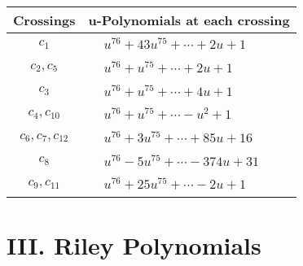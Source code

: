 \documentclass[1p]{elsarticle_modified}
\theoremstyle{definition}
\begin{document}
\begin{tabular}{m{50pt}|m{274pt}}
Crossings & \hspace{64pt}u-Polynomials at each crossing \\
\hline $$\begin{aligned}c_{1}\end{aligned}$$&$\begin{aligned}
&u^{76}+43 u^{75}+\cdots+2 u+1
\end{aligned}$\\
\hline $$\begin{aligned}c_{2},c_{5}\end{aligned}$$&$\begin{aligned}
&u^{76}+u^{75}+\cdots+2 u+1
\end{aligned}$\\
\hline $$\begin{aligned}c_{3}\end{aligned}$$&$\begin{aligned}
&u^{76}+u^{75}+\cdots+4 u+1
\end{aligned}$\\
\hline $$\begin{aligned}c_{4},c_{10}\end{aligned}$$&$\begin{aligned}
&u^{76}+u^{75}+\cdots- u^2+1
\end{aligned}$\\
\hline $$\begin{aligned}c_{6},c_{7},c_{12}\end{aligned}$$&$\begin{aligned}
&u^{76}+3 u^{75}+\cdots+85 u+16
\end{aligned}$\\
\hline $$\begin{aligned}c_{8}\end{aligned}$$&$\begin{aligned}
&u^{76}-5 u^{75}+\cdots-374 u+31
\end{aligned}$\\
\hline $$\begin{aligned}c_{9},c_{11}\end{aligned}$$&$\begin{aligned}
&u^{76}+25 u^{75}+\cdots-2 u+1
\end{aligned}$\\
\hline
\end{tabular}\newpage\renewcommand{\arraystretch}{1}
\centering \section*{ III. Riley Polynomials}
\end{document}
